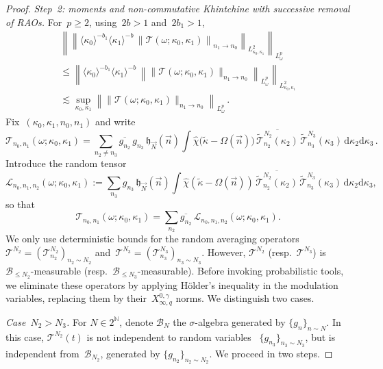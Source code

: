 \documentclass[11pt,reqno,english]{amsart}
\numberwithin{equation}{section}
\theoremstyle{plain}
\theoremstyle{definition}
\theoremstyle{remark}
\newcommand{\N}{\mathbb{N}}
\begin{document}
\begin{proof}
	\emph{Step~2: moments and non-commutative Khintchine with successive removal of RAOs.}
	For~$p\ge 2$, using~$2b>1$ and~$2b_{1}>1$,
	\begin{multline}
		\label{eq:01}
		\left\|
		\left\|
		\langle\kappa_{0}\rangle^{-b_{1}}\langle\kappa_{1}\rangle^{-b}\,
		\left\|\mathcal{T}(\omega;\kappa_{0},\kappa_{1})\right\|_{n_{1}\to n_{0}}
		\right\|_{L^{2}_{\kappa_{0},\kappa_{1}}}
		\right\|_{L_{\omega}^{p}}
		\\
		\le
		\left\|
		\langle\kappa_{0}\rangle^{-b_{1}}\langle\kappa_{1}\rangle^{-b}\,
		\left\|
		\|\mathcal{T}(\omega;\kappa_{0},\kappa_{1})\|_{n_{1}\to n_{0}}
		\right\|_{L_{\omega}^{p}}
		\right\|_{L^{2}_{\kappa_{0},\kappa_{1}}}
		\\
		\lesssim
		\sup_{\kappa_{0},\kappa_{1}}
		\left\|
		\|\mathcal{T}(\omega;\kappa_{0},\kappa_{1})\|_{n_{1}\to n_{0}}
		\right\|_{L_{\omega}^{p}}\,.
	\end{multline}
	Fix~$(\kappa_{0},\kappa_{1},n_{0},n_{1})$ and write
	\[
	\mathcal{T}_{n_{0},n_{1}}(\omega;\kappa_{0},\kappa_{1})
	=
	\sum_{n_{2}\neq n_{3}}
	\overline{g_{n_{2}}}\,g_{n_{3}}\,
	\mathfrak{h}_{\vec{N}}(\vec n)
	\int
	\widehat{\chi}\big(\widetilde{\kappa}-\Omega(\vec n)\big)\,
	\overline{\widetilde{\mathcal{T}}_{n_{2}}^{N_{2}}(\kappa_{2})}\,
	\widetilde{\mathcal{T}}_{n_{3}}^{N_{3}}(\kappa_{3})\,
	\mathrm{d}\kappa_{2}\mathrm{d}\kappa_{3}\,.
	\]
	Introduce the random tensor
	\[
	\mathcal{L}_{n_{0},n_{1},n_{2}}(\omega;\kappa_{0},\kappa_{1})
	:=
	\sum_{n_{3}}
	g_{n_{3}}\,
	\mathfrak{h}_{\vec{N}}(\vec n)
	\int
	\widehat{\chi}(\widetilde{\kappa}-\Omega(\vec n))\,
	\overline{\widetilde{\mathcal{T}}_{n_{2}}^{N_{2}}(\kappa_{2})}\,
	\widetilde{\mathcal{T}}_{n_{3}}^{N_{3}}(\kappa_{3})\,
	\mathrm{d}\kappa_{2}\mathrm{d}\kappa_{3},
	\]
	so that
	\[
	\mathcal{T}_{n_{0},n_{1}}(\omega;\kappa_{0},\kappa_{1})
	=\sum_{n_{2}}
	\overline{g_{n_{2}}}\,
	\mathcal{L}_{n_{0},n_{1},n_{2}}(\omega;\kappa_{0},\kappa_{1}).
	\]
	We only use deterministic bounds for the random averaging operators~$\mathcal{T}^{N_{2}}=(\mathcal{T}_{n_2}^{N_2})_{n_2\sim N_2}$ and~$\mathcal{T}^{N_{3}}=(\mathcal{T}_{n_3}^{N_3})_{n_3\sim N_3}$.
	However, $\mathcal{T}^{N_{2}}$ (resp.\ $\mathcal{T}^{N_{3}}$) is~$\mathcal{B}_{\leq N_{2}}$-measurable (resp.\ $\mathcal{B}_{\leq N_{3}}$-measurable).
	Before invoking probabilistic tools, we eliminate these operators by applying Hölder's inequality in the modulation variables, replacing them by their~$X^{0,\gamma}_{\infty,q}$ norms.
	We distinguish two cases.

	\noindent\emph{Case~$N_{2}>N_{3}$.}
	For $N\in 2^{\N}$, denote $\mathcal{B}_{N}$ the $\sigma$-algebra generated by $\{g_n\}_{n\sim N}$.
	In this case,  $\mathcal{T}^{N_{2}}(t)$ is not independent to random variables ~$\{g_{n_{3}}\}_{n_{3}\sim N_{3}}$, but is independent from~$\mathcal{B}_{N_2}$, generated by $\{g_{n_2} \}_{n_2\sim N_2}$.  We proceed in two steps.


\end{proof}
\end{document}
